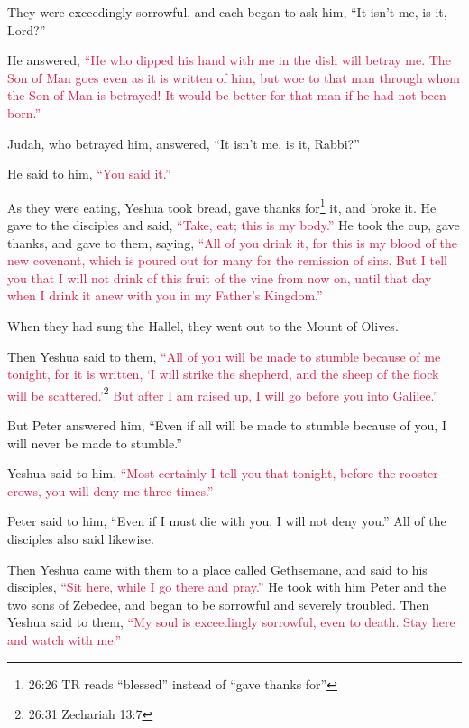 \myverse{}They were exceedingly sorrowful, and each began to ask him,
“It isn’t me, is it, Lord?”

\myverse{}He answered,
\textcolor{crimson}{“He who dipped his hand with me in the dish will betray me.
}
\myverse{}\textcolor{crimson}{The Son of Man goes even as it is written of him, but woe to that man
	through whom the Son of Man is betrayed! It would be better for that man if he had not been born.”}

\myverse{}Judah, who betrayed him, answered, “It isn’t me, is it, Rabbi?”

He said to him,
\textcolor{crimson}{“You said it.”}

\myverse{}As they were eating, Yeshua took bread, gave thanks for\footnote{26:26 TR reads “blessed” instead of “gave thanks for”} it, and broke it. He gave to the disciples
and said,
\textcolor{crimson}{“Take, eat; this is my body.”}
\myverse{}He took the cup, gave thanks, and gave to them, saying,
\textcolor{crimson}{“All of you drink it,
}
\myverse{}\textcolor{crimson}{for this is my blood of the new covenant, which is poured out for many
	for the remission of sins.
}
\myverse{}\textcolor{crimson}{But I tell you that I will not drink of this fruit of the vine from now
	on, until that day when I drink it anew with you in my Father’s Kingdom.”
}

\myverse{}When they had sung the Hallel, they went out to the Mount of
Olives.

\myverse{}Then Yeshua said to them,
\textcolor{crimson}{“All of you will be made to stumble because of me tonight, for it is written, ‘I will strike the shepherd,
	and the sheep of the flock will be scattered.’}\footnote{26:31 Zechariah 13:7}
\myverse{}\textcolor{crimson}{But after I am raised up, I will go before you into Galilee.”
}

\myverse{}But Peter answered him, “Even if all will be made to stumble
because of you, I will never be made to stumble.”

\myverse{}Yeshua said to him,
\textcolor{crimson}{“Most certainly I tell you that tonight, before the rooster crows, you will deny me three times.”}

\myverse{}Peter said to him, “Even if I must die with you, I will not
deny you.” All of the disciples also said likewise.

\myverse{}Then Yeshua came with them to a place called Gethsemane, and
said to his disciples,
\textcolor{crimson}{“Sit here, while I go there and pray.”}
\myverse{}He took with him Peter and the two sons of Zebedee, and began to be sorrowful
and severely troubled.
\myverse{}Then Yeshua said to them,
\textcolor{crimson}{“My soul is exceedingly sorrowful, even to death. Stay here and watch with me.”}

